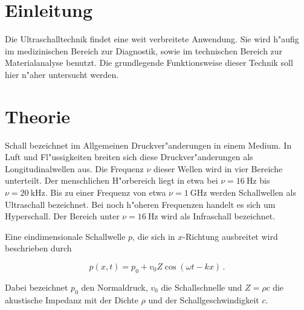 \section{Einleitung} %
\label{sec:einleitung}
	Die Ultraschalltechnik findet eine weit verbreitete Anwendung.
	Sie wird h"aufig im medizinischen Bereich zur Diagnostik, sowie im technischen Bereich zur Materialanalyse benutzt.
	Die grundlegende Funktionsweise dieser Technik soll hier n"aher untersucht werden.
\section{Theorie} %
\label{sec:theorie}
	Schall bezeichnet im Allgemeinen Druckver"anderungen in einem Medium.
	In Luft und Fl"ussigkeiten breiten sich diese Druckver"anderungen als Longitudinalwellen aus.
	Die Frequenz $\nu$ dieser Wellen wird in vier Bereiche unterteilt.
	Der menschlichen H"orbereich liegt in etwa bei $\nu = \SI{16}{\hertz}$ bis $\nu = \SI{20}{\kilo \hertz}$.
	Bis zu einer Frequenz von etwa $\nu = \SI{1}{\giga \hertz}$ werden Schallwellen als Ultraschall bezeichnet.
	Bei noch h"oheren Frequenzen handelt es sich um Hyperschall.
	Der Bereich unter $\nu = \SI{16}{\hertz}$ wird als Infraschall bezeichnet.

	Eine eindimensionale Schallwelle $p$, die sich in $x$-Richtung ausbreitet wird beschrieben durch

	\begin{equation}
		p(x,t) = p_0 + v_0 Z \cos{(\omega t - kx)} \,.
	\end{equation}

	Dabei bezeichnet $p_0$ den Normaldruck, $v_0$ die Schallschnelle und $Z = \rho c$ die akustische Impedanz mit der Dichte $\rho$ und der Schallgeschwindigkeit $c$.

